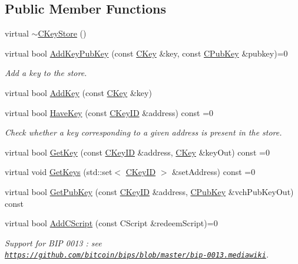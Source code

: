 \subsection*{Public Member Functions}
\begin{DoxyCompactItemize}
\item 
virtual \hyperlink{class_c_key_store_a9bfaef2bcd6effc467a96043f44044a0}{$\sim$\+C\+Key\+Store} ()
\item 
virtual bool \hyperlink{class_c_key_store_a1956e4f5860ded321d6f697047d8236a}{Add\+Key\+Pub\+Key} (const \hyperlink{class_c_key}{C\+Key} \&key, const \hyperlink{class_c_pub_key}{C\+Pub\+Key} \&pubkey)=0
\begin{DoxyCompactList}\small\item\em Add a key to the store. \end{DoxyCompactList}\item 
virtual bool \hyperlink{class_c_key_store_a0b4ca43724cfcc6e2ea70c0baa192750}{Add\+Key} (const \hyperlink{class_c_key}{C\+Key} \&key)
\item 
virtual bool \hyperlink{class_c_key_store_a9398451d4270fae27b29f686a9d43a65}{Have\+Key} (const \hyperlink{class_c_key_i_d}{C\+Key\+I\+D} \&address) const =0
\begin{DoxyCompactList}\small\item\em Check whether a key corresponding to a given address is present in the store. \end{DoxyCompactList}\item 
virtual bool \hyperlink{class_c_key_store_a2dffca468fef2e5da2e42a7c983d968a}{Get\+Key} (const \hyperlink{class_c_key_i_d}{C\+Key\+I\+D} \&address, \hyperlink{class_c_key}{C\+Key} \&key\+Out) const =0
\item 
virtual void \hyperlink{class_c_key_store_aca5044014720308f191113e7ba297d13}{Get\+Keys} (std\+::set$<$ \hyperlink{class_c_key_i_d}{C\+Key\+I\+D} $>$ \&set\+Address) const =0
\item 
virtual bool \hyperlink{class_c_key_store_aba866c1e71c129e7ac2d5d1e5223c8a5}{Get\+Pub\+Key} (const \hyperlink{class_c_key_i_d}{C\+Key\+I\+D} \&address, \hyperlink{class_c_pub_key}{C\+Pub\+Key} \&vch\+Pub\+Key\+Out) const 
\item 
virtual bool \hyperlink{class_c_key_store_a2fb2e02e8cdc364607efd5ebb14b8064}{Add\+C\+Script} (const C\+Script \&redeem\+Script)=0
\begin{DoxyCompactList}\small\item\em Support for B\+I\+P 0013 \+: see \href{https://github.com/bitcoin/bips/blob/master/bip-0013.mediawiki}{\tt https\+://github.\+com/bitcoin/bips/blob/master/bip-\/0013.\+mediawiki}. \end{DoxyCompactList}\item 

\end{DoxyCompactItemize}
